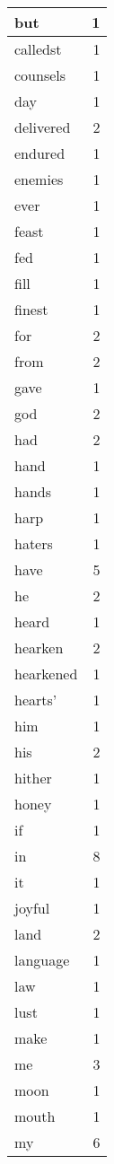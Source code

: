 \begin{center}
\begin{longtable}{l|r}
but & 1 \\ \hline
calledst & 1 \\ \hline
counsels & 1 \\ \hline
day & 1 \\ \hline
delivered & 2 \\ \hline
endured & 1 \\ \hline
enemies & 1 \\ \hline
ever & 1 \\ \hline
feast & 1 \\ \hline
fed & 1 \\ \hline
fill & 1 \\ \hline
finest & 1 \\ \hline
for & 2 \\ \hline
from & 2 \\ \hline
gave & 1 \\ \hline
god & 2 \\ \hline
had & 2 \\ \hline
hand & 1 \\ \hline
hands & 1 \\ \hline
harp & 1 \\ \hline
haters & 1 \\ \hline
have & 5 \\ \hline
he & 2 \\ \hline
heard & 1 \\ \hline
hearken & 2 \\ \hline
hearkened & 1 \\ \hline
hearts' & 1 \\ \hline
him & 1 \\ \hline
his & 2 \\ \hline
hither & 1 \\ \hline
honey & 1 \\ \hline
if & 1 \\ \hline
in & 8 \\ \hline
it & 1 \\ \hline
joyful & 1 \\ \hline
land & 2 \\ \hline
language & 1 \\ \hline
law & 1 \\ \hline
lust & 1 \\ \hline
make & 1 \\ \hline
me & 3 \\ \hline
moon & 1 \\ \hline
mouth & 1 \\ \hline
my & 6 \\ \hline

\end{longtable}
\end{center}
